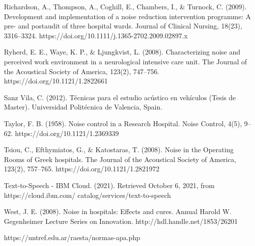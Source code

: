 \documentclass{untref-plan}
\begin{document}
\begin{referencias}
Richardson, A., Thompson, A., Coghill, E., Chambers, I., \& Turnock, C. (2009). Development and implementation of a noise reduction intervention programme: A pre- and postaudit of three hospital wards. Journal of Clinical Nursing, 18(23), 3316–3324. https://doi.org/10.1111/j.1365-2702.2009.02897.x

Ryherd, E. E., Waye, K. P., \& Ljungkvist, L. (2008). Characterizing noise and perceived work environment in a neurological intensive care unit. The Journal of the Acoustical Society of America, 123(2), 747–756. https://doi.org/10.1121/1.2822661

Sanz Vila, C. (2012). Técnicas para el estudio acústico en vehículos (Tesis de Master). Universidad Politécnica de Valencia, Spain.

Taylor, F. B. (1958). Noise control in a Research Hospital. Noise Control, 4(5), 9–62. https://doi.org/10.1121/1.2369339

Tsiou, C., Efthymiatos, G., \& Katostaras, T. (2008). Noise in the Operating Rooms of Greek hospitals. The Journal of the Acoustical Society of America, 123(2), 757–765. https://doi.org/10.1121/1.2821972

Text-to-Speech - IBM Cloud. (2021). Retrieved October 6, 2021, from https://cloud.ibm.com/ catalog/services/text-to-speech

West, J. E. (2008). Noise in hospitals: Effects and cures. Annual Harold W. Gegenheimer Lecture Series on Innovation. http://hdl.handle.net/1853/26201

https://untref.edu.ar/raesta/normas-apa.php

\end{referencias}
\end{document}
